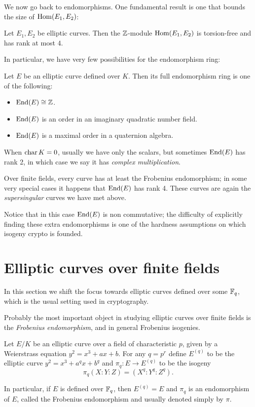 We now go back to endomorphisms. One fundamental result is one that bounds the size of $\operatorname{Hom}(E_1,E_2)$:
\begin{proposition}
    Let $E_1,E_2$ be elliptic curves. Then the $\mathbb{Z}$-module $\operatorname{Hom}(E_1,E_2)$ is torsion-free and has rank at most $4$.
\end{proposition}

In particular, we have very few possibilities for the endomorphism ring:
\begin{theorem}
    Let $E$ be an elliptic curve defined over $K$. Then its full endomorphism ring is one of the following:
    \begin{itemize}
        \item $\operatorname{End}(E)\cong\mathbb{Z}$.
        \item $\operatorname{End}(E)$ is an order in an imaginary quadratic number field.
        \item $\operatorname{End}(E)$ is a maximal order in a quaternion algebra.
    \end{itemize}
\end{theorem}

When $\operatorname{char} K=0$, usually we have only the scalars, but sometimes $\operatorname{End}(E)$ has rank 2, in which case we say it has \emph{complex multiplication}.

Over finite fields, every curve has at least the Frobenius endomorphism; in some very special cases it happens that $\operatorname{End}(E)$ has rank 4. These curves are again the \emph{supersingular} curves we have met above.

Notice that in this case $\operatorname{End}(E)$ is non commutative; the difficulty of explicitly finding these extra endomorphisms is one of the hardness assumptions on which isogeny crypto is founded.


\section{Elliptic curves over finite fields}

In this section we shift the focus towards elliptic curves defined over some $\mathbb{F}_q$, which is the usual setting used in cryptography.

Probably the most important object in studying elliptic curves over finite fields is the \emph{Frobenius endomorphism}, and in general Frobenius isogenies.

\begin{definition}
    Let $E/K$ be an elliptic curve over a field of characteristic $p$, given by a Weierstrass equation $y^2=x^3+ax+b$. For any $q=p^r$ define $E^{(q)}$ to be the elliptic curve $y^2=x^3+a^qx+b^q$ and $\pi_q:E\to E^{(q)}$ to be the isogeny $$\pi_q(X:Y:Z)=(X^q:Y^q:Z^q).$$
    
    In particular, if $E$ is defined over $\mathbb{F}_q$, then $E^{(q)}=E$ and $\pi_q$ is an endomorphism of $E$, called the Frobenius endomorphism and usually denoted simply by $\pi$.
\end{definition}

